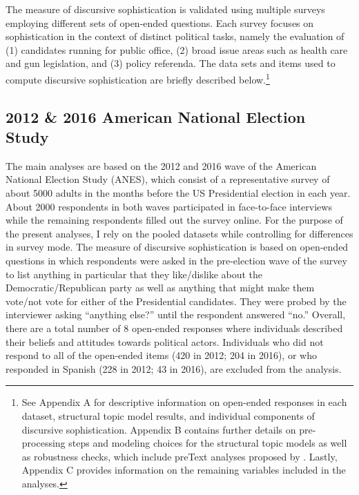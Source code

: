 The measure of discursive sophistication is validated using multiple surveys employing different sets of open-ended questions. Each survey focuses on sophistication in the context of distinct political tasks, namely the evaluation of (1) candidates running for public office, (2) broad issue areas such as health care and gun legislation, and (3) policy referenda. The data sets and items used to compute discursive sophistication are briefly described below.\footnote{See Appendix A for descriptive information on open-ended responses in each dataset, structural topic model results, and individual components of discursive sophistication. Appendix B contains further details on pre-processing steps and modeling choices for the structural topic models as well as robustness checks, which include preText analyses proposed by \citet{denny2018text}. Lastly, Appendix C provides information on the remaining variables included in the analyses.}


\subsection{2012 \& 2016 American National Election Study}
The main analyses are based on the 2012 and 2016 wave of the American National Election Study (ANES), which consist of a representative survey of about 5000 adults in the months before the US Presidential election in each year. About 2000 respondents in both waves participated in face-to-face interviews while the remaining respondents filled out the survey online. For the purpose of the present analyses, I rely on the pooled datasets while controlling for differences in survey mode. The measure of discursive sophistication is based on open-ended questions in which respondents were asked in the pre-election wave of the survey to list anything in particular that they like/dislike about the Democratic/Republican party as well as anything that might make them vote/not vote for either of the Presidential candidates. They were probed by the interviewer asking ``anything else?'' until the respondent answered ``no.'' Overall, there are a total number of 8 open-ended responses where individuals described their beliefs and attitudes towards political actors. Individuals who did not respond to all of the open-ended items (420 in 2012; 204 in 2016), or who responded in Spanish (228 in 2012; 43 in 2016), are excluded from the analysis.


